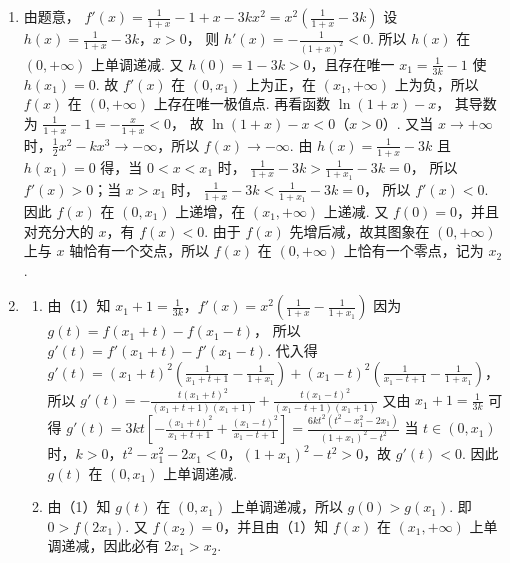 \begin{solution}
\begin{enumerate}
\item 由题意，
\(
f'(x)=\frac{1}{1+x}-1+x-3kx^2=x^2\left(\frac{1}{1+x}-3k\right)
\)
设
\(h(x)=\frac{1}{1+x}-3k\)，\(x>0\)，
则
\(h'(x)=-\frac{1}{(1+x)^2}<0\).
所以 \(h(x)\) 在 \((0,+\infty)\) 上单调递减. 又 \(h(0)=1-3k>0\)，且存在唯一
\(x_1=\frac{1}{3k}-1\)
使 \(h(x_1)=0\). 故 \(f'(x)\) 在 \((0,x_1)\) 上为正，在 \((x_1,+\infty)\) 上为负，所以 \(f(x)\) 在 \((0,+\infty)\) 上存在唯一极值点.
再看函数
\(\ln(1+x)-x\)，
其导数为
\(\frac{1}{1+x}-1=-\frac{x}{1+x}<0\)，
故 \(\ln(1+x)-x<0\)（\(x>0\)）. 又当 \(x\to +\infty\) 时，\(\frac12x^2-kx^3\to -\infty\)，所以
\(f(x)\to -\infty\).
由 \(h(x)=\frac{1}{1+x}-3k\) 且 \(h(x_1)=0\) 得，当 \(0<x<x_1\) 时，
\(\frac{1}{1+x}-3k>\frac{1}{1+x_1}-3k=0\)，
所以 \(f'(x)>0\)；当 \(x>x_1\) 时，
\(\frac{1}{1+x}-3k<\frac{1}{1+x_1}-3k=0\)，
所以 \(f'(x)<0\). 因此 \(f(x)\) 在 \((0,x_1)\) 上递增，在 \((x_1,+\infty)\) 上递减.
又 \(f(0)=0\)，并且对充分大的 \(x\)，有 \(f(x)<0\). 由于 \(f(x)\) 先增后减，故其图象在 \((0,+\infty)\) 上与 \(x\) 轴恰有一个交点，所以 \(f(x)\) 在 \((0,+\infty)\) 上恰有一个零点，记为 \(x_2\).

\item
\begin{enumerate}
\item 由（1）知
\(x_1+1=\frac{1}{3k}\)，\(f'(x)=x^2\left(\frac{1}{1+x}-\frac{1}{1+x_1}\right)\)
因为
\(g(t)=f(x_1+t)-f(x_1-t)\)，
所以
\(g'(t)=f'(x_1+t)-f'(x_1-t)\).
代入得
\(
g'(t)=(x_1+t)^2\left(\frac{1}{x_1+t+1}-\frac{1}{1+x_1}\right)
+(x_1-t)^2\left(\frac{1}{x_1-t+1}-\frac{1}{1+x_1}\right)
\)，
所以
\(
g'(t)=-\frac{t(x_1+t)^2}{(x_1+t+1)(x_1+1)}
+\frac{t(x_1-t)^2}{(x_1-t+1)(x_1+1)}
\)
又由 \(x_1+1=\frac{1}{3k}\) 可得
\(
g'(t)=3kt\left[-\frac{(x_1+t)^2}{x_1+t+1}+\frac{(x_1-t)^2}{x_1-t+1}\right]
=\frac{6kt^2(t^2-x_1^2-2x_1)}{(1+x_1)^2-t^2}
\)
当 \(t\in(0,x_1)\) 时，\(k>0\)，\(t^2-x_1^2-2x_1<0\)，\((1+x_1)^2-t^2>0\)，故
\(g'(t)<0\).
因此 \(g(t)\) 在 \((0,x_1)\) 上单调递减.

\item 由（1）知 \(g(t)\) 在 \((0,x_1)\) 上单调递减，所以
\(g(0)>g(x_1)\).
即
\(0>f(2x_1)\).
又 \(f(x_2)=0\)，并且由（1）知 \(f(x)\) 在 \((x_1,+\infty)\) 上单调递减，因此必有
\(2x_1>x_2\).
\end{enumerate}
\end{enumerate}
\end{solution}

